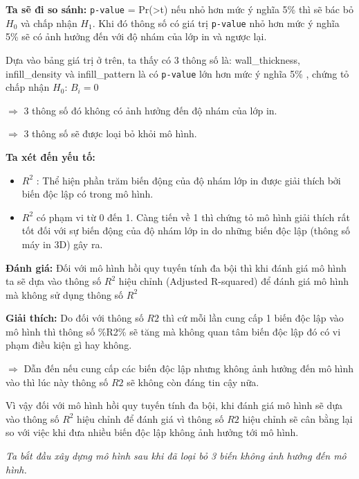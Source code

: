 \textbf{Ta sẽ đi so sánh:} \texttt{p-value} =
Pr(\textgreater\textbar t\textbar) nếu nhỏ hơn mức ý nghĩa 5\% thì sẽ
bác bỏ \(H_0\) và chấp nhận \(H_1\). Khi đó thông số có giá trị
\texttt{p-value} nhỏ hơn mức ý nghĩa 5\% sẽ có ảnh hưởng đến với độ nhám
của lớp in và ngược lại.

Dựa vào bảng giá trị ở trên, ta thấy có 3 thông số là: wall\_thickness,
infill\_density và infill\_pattern là có \texttt{p-value} lớn hơn mức ý
nghĩa 5\% , chứng tỏ chấp nhận \(H_0\): \(B_i=0\)

\(\Rightarrow\) 3 thông số đó không có ảnh hưởng đến độ nhám của lớp in.

\(\Rightarrow\) 3 thông số sẽ được loại bỏ khỏi mô hình.

\textbf{Ta xét đến yếu tố:}

\begin{itemize}
\item
  \(R^2\) : Thể hiện phần trăm biến động của độ nhám lớp in được giải
  thích bởi biến độc lập có trong mô hình.
\item
  \(R^2\) có phạm vi từ 0 đến 1. Càng tiến về 1 thì chứng tỏ mô hình
  giải thích rất tốt đối với sự biến động của độ nhám lớp in do những
  biến độc lập (thông số máy in 3D) gây ra.
\end{itemize}

\textbf{Đánh giá: } Đối với mô hình hồi quy tuyến tính đa bội thì khi
đánh giá mô hình ta sẽ dựa vào thông số \(R^2\) hiệu chỉnh (Adjusted
R-squared) để đánh giá mô hình mà không sử dụng thông số \(R^2\)

\textbf{Giải thích: } Do đối với thông số \(R2\) thì cứ mỗi lần cung cấp
1 biến độc lập vào mô hình thì thông số \%R2\% sẽ tăng mà không quan tâm
biến độc lập đó có vi phạm điều kiện gì hay không.

\(\Rightarrow\) Dẫn đến nếu cung cấp các biến độc lập nhưng không ảnh hưởng đến mô
hình vào thì lúc này thông số \(R2\) sẽ không còn đáng tin cậy nữa.

Vì vậy đối với mô hình hồi quy tuyến tính đa bội, khi đánh giá mô hình
sẽ dựa vào thông số \(R^2\) hiệu chỉnh để đánh giá vì thông số \(R2\)
hiệu chỉnh sẽ cân bằng lại so với việc khi đưa nhiều biến độc lập không
ảnh hưởng tới mô hình.

\emph{Ta bắt đầu xây dựng mô hình sau khi đã loại bỏ 3 biến không ảnh
hưởng đến mô hình.}

\begin{Shaded}
\begin{Highlighting}[]
\OtherTok{\textless{}{-}} \SpecialCharTok{\textasciitilde{}}\SpecialCharTok{+}\SpecialCharTok{+}
\SpecialCharTok{+}\SpecialCharTok{+}
\end{Highlighting}
\end{Shaded}

